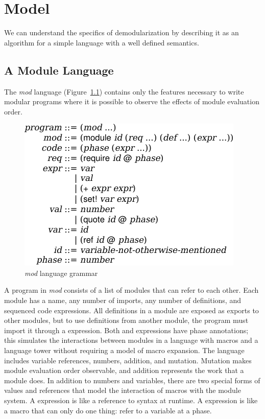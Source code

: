 \chapter{Model}

We can understand the specifics of demodularization by describing it as an algorithm for a simple language with a well defined semantics.

\section{A Module Language}
The \emph{mod} language (Figure~\ref{fig:source-lang}) contains only the features necessary to write modular programs where it is possible to observe the effects of module evaluation order.

\begin{figure}[h]
\includegraphics{figures/source}
\caption{\emph{mod} language grammar}
\label{fig:source-lang}
\end{figure}

A program in \emph{mod} consists of a list of modules that can refer to each other.
Each module has a name, any number of imports, any number of definitions, and sequenced code expressions. 
All definitions in a module are exposed as exports to other modules, but to use definitions from another module, the program must import it through a  expression.
Both  and  expressions have phase annotations; this simulates the interactions between modules in a language with macros and a language tower without requiring a model of macro expansion.
The language includes variable references, numbers, addition, and mutation.
Mutation makes module evaluation order observable, and addition represents the work that a module does.
In addition to numbers and variables, there are two special forms of values and references that model the interaction of macros with the module system.
A  expression is like a reference to syntax at runtime.
A  expression is like a macro that can only do one thing: refer to a variable at a phase.

